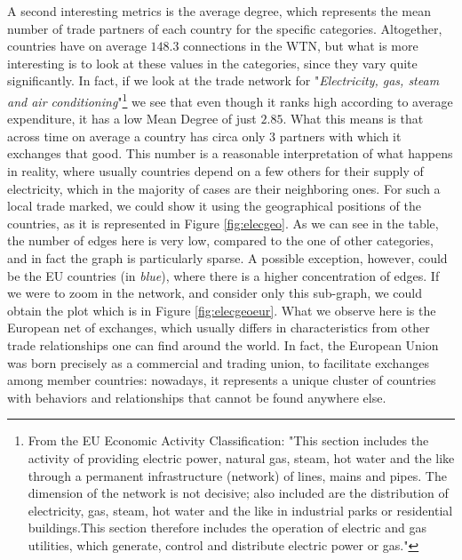 A second interesting metrics is the average degree, which represents the mean number of trade partners of each country for the specific categories. Altogether, countries have on average $148.3$ connections in the WTN, but what is more interesting is to look at these values in the categories, since they vary quite significantly. In fact, if we look at the trade network for "\textit{Electricity, gas, steam and air conditioning}"\footnote{
    From the EU Economic Activity Classification:
    "This section includes the activity of providing electric power, natural gas, steam, hot water and the like through a permanent infrastructure (network) of lines, mains and pipes. The dimension of the network is not decisive; also included are the distribution of electricity, gas, steam, hot water and the like in industrial parks or residential buildings.This section therefore includes the operation of electric and gas utilities, which generate, control and distribute electric power or gas."\cite{eurostat2022website}
} we see that even though it ranks high according to average expenditure, it has a low Mean Degree of just $2.85$. What this means is that across time on average a country has circa only 3 partners with which it exchanges that good. This number is a reasonable interpretation of what happens in reality, where usually countries depend on a few others for their supply of electricity, which in the majority of cases are their neighboring ones. For such a local trade marked, we could show it using the geographical positions of the countries, as it is represented in Figure \ref{fig:elecgeo}. As we can see in the table, the number of edges here is very low, compared to the one of other categories, and in fact the graph is particularly sparse. A possible exception, however, could be the EU countries (in \textit{blue}), where there is a higher concentration of edges. If we were to zoom in the network, and consider only this sub-graph, we could obtain the plot which is in Figure \ref{fig:elecgeoeur}. What we observe here is the European net of exchanges, which usually differs in characteristics from other trade relationships one can find around the world. In fact, the European Union was born precisely as a commercial and trading union, to facilitate exchanges among member countries: nowadays, it represents a unique cluster of countries with behaviors and relationships that cannot be found anywhere else.

